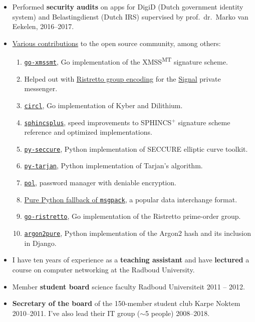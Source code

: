 \documentclass{article}
\newcommand\partitle[1]{\vskip20pt\par\noindent{\textsf{\textbf{#1}}}}
\begin{document}
\partitle{Relevant experience}
\begin{itemize}
    \item Performed \textbf{security audits}
        on apps for DigiD (Dutch government identity system)
        and Belastingdienst (Dutch IRS) supervised by prof.~dr.~Marko van Eekelen,
        2016--2017.
    \item \href{https://github.com/bwesterb}{Various contributions} to the open source community, among others:
        \begin{enumerate}
            \item \href{https://github.com/bwesterb/go-xmssmt}{\texttt{go-xmssmt}}, Go implementation of the XMSS\textsuperscript{MT}
                        signature scheme.
                \item Helped out with
        \href{https://github.com/signalapp/curve25519-dalek/commit/c2320e9137ab1d02234620ed4f3b22371f688db2}{Ristretto
                    group encoding} for the \href{https://signal.org/en/}{Signal} private messenger.
            \item \href{https://github.com/cloudflare/circl}{\texttt{circl}}, Go implementation of
                    Kyber and Dilithium.
            \item \href{https://github.com/sphincs/sphincsplus}{\texttt{sphincsplus}},
                    speed improvements to SPHINCS$^+$ signature scheme reference and optimized implementations.
            \item \href{https://github.com/bwesterb/py-seccure}{\texttt{py-seccure}}, Python implementation of SECCURE elliptic curve toolkit.
            \item \href{https://github.com/bwesterb/py-tarjan}{\texttt{py-tarjan}}, Python implementation of Tarjan's algorithm.
            \item \href{https://github.com/bwesterb/pol}{\texttt{pol}}, password manager with deniable encryption.
            \item \href{https://github.com/msgpack/msgpack-python/pull/42}{Pure Python fallback of \texttt{msgpack}}, a popular data interchange format.
            \item \href{https://github.com/bwesterb/go-ristretto}{\texttt{go-ristretto}}, Go implementation of the Ristretto prime-order group.
            \item \href{https://github.com/bwesterb/argon2pure}{\texttt{argon2pure}}, Python implementation of the Argon2 hash and its inclusion
                    in Django.
        \end{enumerate}
    \item I have ten years of experience as a \textbf{teaching assistant}
            and have \textbf{lectured} a course on computer networking
            at the Radboud University.
    \item Member \textbf{student board} science faculty Radboud Universiteit
        2011 -- 2012.
    \item \textbf{Secretary of the board} of the 150-member student
        club Karpe Noktem 2010--2011.
        I've also lead their IT group ($\sim$5 people)  2008--2018.
\end{itemize}
\end{document}
